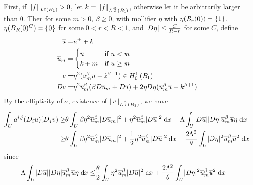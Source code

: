 First, if $\lnorm{f}{q}{\ballunit} > 0$, let $k = \lnorm{f}{\frac{n}{2}}{\ballunit}$,
otherwise let it be arbitrarily larger than $0$.
Then for some $m > 0$, $\beta \geq 0$, with mollifier $\eta$ with $\eta(\ball{0}{r}) = \set{ 1 }$,
$\eta(\ball{0}{R}^C) = \set{ 0 }$ for some $0 < r < R < 1$,
and $\lvert \grad \eta \rvert \leq \frac{C}{R - r}$ for some $C$, define
\begin{align*}
  \overline{u} = &u^+ + k\\
  \overline{u}_m = &
  \begin{cases}
    \overline{u} & \text{if } u < m\\
    k + m & \text{if } u \geq m\\
  \end{cases}\\
  v = &\eta^2 (\overline{u}_{m}^{\beta} \overline{u} - k^{\beta + 1})
         \in \sobolevhcs{\ballunit}{1}\\
 \grad v = &\eta^2 \overline{u}_m^\beta (\beta \grad \overline{u}_m + \grad \overline{u})
            + 2 \eta \grad \eta (\overline{u}_m^\beta \overline{u} - k^{\beta + 1})\\
\end{align*}
By the ellipticity of $a$, existence of $\lnorm{c}{\frac{n}{2}}{\ballunit}$, we have
\begin{align*}
  \int_{\domain} a^{i, j} (\graddir{i} u) (\graddir{j} v)
    \geq & \theta \int_{\domain} \beta \eta^2 \overline{u}_m^\beta \lvert \grad \overline{u}_m \rvert^2
           + \eta^2 \overline{u}_m^\beta \lvert \grad \overline{u} \rvert^2 \dx
           - \Lambda \int_{\domain} \lvert \grad \overline{u} \rvert \lvert \grad \eta \rvert \overline{u}_m^\beta \overline{u} \eta \dx\\
    \geq & \theta \int_{\domain} \beta \eta^2 \overline{u}_m^\beta \lvert \grad \overline{u}_m \rvert^2
           + \frac{1}{2} \eta^2 \overline{u}_m^\beta \lvert \grad \overline{u} \rvert^2 \dx
           - \frac{2 \Lambda^2}{\theta} \int_{\domain} \lvert \grad \eta \rvert^2 \overline{u}_m^\beta \overline{u}^2 \dx\\
\end{align*}
since %
\begin{align*}
  \Lambda \int_{\domain} \lvert \grad \overline{u} \rvert \lvert \grad \eta \rvert \overline{u}_m^\beta \overline{u} \eta \dx
    \leq & \frac{\theta}{2} \int_{\domain} \eta^2 \overline{u}_m^\beta \lvert \grad \overline{u} \rvert^2 \dx
           + \frac{2 \Lambda^2}{\theta} \int_{\domain} \lvert \grad \eta \rvert^2 \overline{u}_m^\beta \overline{u}^2 \dx
\end{align*}
